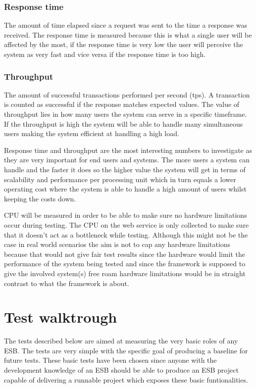\subsubsection{Response time}
The amount of time elapsed since a request was sent to the time a response was received. 
The response time is measured because this is what a single user will be affected by the most, if the response time is very low the user will perceive the system as very fast and vice versa if the response time is too high.
\subsubsection{Throughput}
The amount of successful transactions performed per second (tps). A transaction is counted as successful if the response matches expected values.
The value of throughput lies in how many users the system can serve in a specific timeframe. If the throughput is high the system will be able to handle many simultaneous users making the system efficient at handling a high load.



Response time and throughput are the most interesting numbers to investigate as they are very important for end users and systems. 
The more users a system can handle and the faster it does so the higher value the system will get in terms of scalability and performance per processing unit which in turn equals a lower operating cost where the system is able to handle a high amount of users whilst keeping the costs down.

CPU will be measured in order to be able to make sure no hardware limitations occur during testing. 
The CPU on the web service is only collected to make sure that it doesn't act as a bottleneck while testing. 
Although this might not be the case in real world scenarios the aim is not to cap any hardware limitations because that would not give fair test results since the hardware would limit the performance of the system being tested and since the framework is supposed to give the involved system(s) free roam hardware limitations would be in straight contrast to what the framework is about.

\section{Test walktrough}
The tests described below are aimed at measuring the very basic roles of any ESB. 
The tests are very simple with the specific goal of producing a baseline for future tests. 
These basic tests have been chosen since anyone with the development knowledge of an ESB should be able to produce an ESB project capable of delivering a runnable project which exposes these basic funtionalities.


